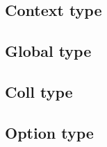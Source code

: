 \subsection{Context type}
\label{sec:type:Context}


\subsection{Global type}
\label{sec:type:Global}


\subsection{Coll type}
\label{sec:type:Coll}


\subsection{Option type}
\label{sec:type:Option}

